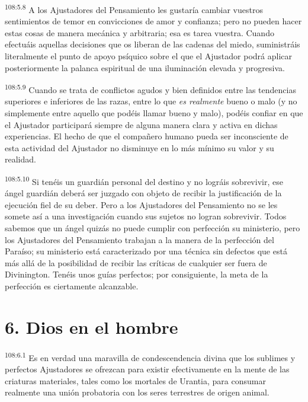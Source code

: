 \par
\textsuperscript{108:5.8} A los Ajustadores del Pensamiento les gustaría cambiar vuestros sentimientos de temor en convicciones de amor y confianza; pero no pueden hacer estas cosas de manera mecánica y arbitraria; esa es tarea vuestra. Cuando efectuáis aquellas decisiones que os liberan de las cadenas del miedo, suministráis literalmente el punto de apoyo psíquico sobre el que el Ajustador podrá aplicar posteriormente la palanca espiritual de una iluminación elevada y progresiva.

\par
\textsuperscript{108:5.9} Cuando se trata de conflictos agudos y bien definidos entre las tendencias superiores e inferiores de las razas, entre lo que \textit{es realmente} bueno o malo (y no simplemente entre aquello que podéis llamar bueno y malo), podéis confiar en que el Ajustador participará siempre de alguna manera clara y activa en dichas experiencias. El hecho de que el compañero humano pueda ser inconsciente de esta actividad del Ajustador no disminuye en lo más mínimo su valor y su realidad.

\par
\textsuperscript{108:5.10} Si tenéis un guardián personal del destino y no lográis sobrevivir, ese ángel guardián deberá ser juzgado con objeto de recibir la justificación de la ejecución fiel de su deber. Pero a los Ajustadores del Pensamiento no se les somete así a una investigación cuando sus sujetos no logran sobrevivir. Todos sabemos que un ángel quizás no puede cumplir con perfección su ministerio, pero los Ajustadores del Pensamiento trabajan a la manera de la perfección del Paraíso; su ministerio está caracterizado por una técnica sin defectos que está más allá de la posibilidad de recibir las críticas de cualquier ser fuera de Divinington. Tenéis unos guías perfectos; por consiguiente, la meta de la perfección es ciertamente alcanzable.

\section*{6. Dios en el hombre}
\par
\textsuperscript{108:6.1} Es en verdad una maravilla de condescendencia divina que los sublimes y perfectos Ajustadores se ofrezcan para existir efectivamente en la mente de las criaturas materiales, tales como los mortales de Urantia, para consumar realmente una unión probatoria con los seres terrestres de origen animal.


